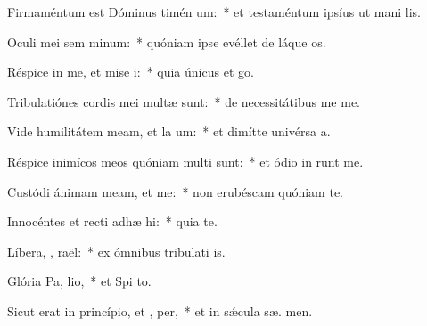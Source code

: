 \item Firmaméntum est Dóminus timén um:~* et testaméntum ipsíus ut mani lis.
\item Oculi mei sem  minum:~* quóniam ipse evéllet de láque  os.
\item Réspice in me, et mise i:~* quia únicus et   go.
\item Tribulatiónes cordis mei multæ sunt:~* de necessitátibus me  me.
\item Vide humilitátem meam, et la um:~* et dimítte univérsa  a.
\item Réspice inimícos meos quóniam multi sunt:~* et ódio in runt me.
\item Custódi ánimam meam, et  me:~* non erubéscam quóniam   te.
\item Innocéntes et recti adhæ hi:~* quia  te.
\item Líbera, , raël:~* ex ómnibus tribulati is.
\item Glória Pa,  lio,~* et Spi to.
\item Sicut erat in princípio, et ,  per,~* et in sǽcula sæ. men.
